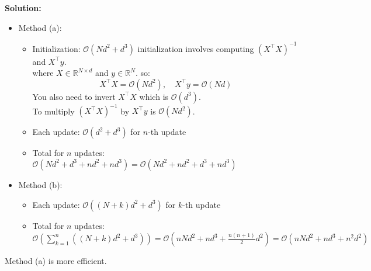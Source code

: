 \documentclass[a3paper,12pt]{extarticle} %
\begin{document}
\begin{enumerate}
\begin{enumerate}
            \textbf{Solution:}
            \begin{itemize}
                \item Method (a):
                \begin{itemize}
                    \item Initialization: \( \mathcal{O}(Nd^2 + d^3) \)
                    initialization involves computing \( (X^\top X)^{-1} \) and \( X^\top y \).
                    \\ where \( X \in \mathbb{R}^{N \times d} \) and \( y \in \mathbb{R}^N \). so:
                    \[
                    X^\top X = \mathcal{O}(Nd^2), \quad X^\top y = \mathcal{O}(Nd)
                    \]
                    You also need to invert \( X^\top X \) which is \( \mathcal{O}(d^3) \).
                    \\ To multiply \( (X^\top X)^{-1} \) by \( X^\top y \) is \( \mathcal{O}(Nd^2) \).  
                    \item Each update: \( \mathcal{O}(d^2 + d^3) \) for \( n \)-th update
                    \item Total for \( n \) updates: \( \mathcal{O}(Nd^2 + d^3 + nd^2 + nd^3) = \mathcal{O}(Nd^2 + nd^2 + d^3 + nd^3) \)
                \end{itemize}
                \item Method (b):
                \begin{itemize}
                    \item Each update: \( \mathcal{O}((N+k)d^2 + d^3) \) for \( k \)-th update
                    \item Total for \( n \) updates: \( \mathcal{O}(\sum_{k=1}^n ((N+k)d^2 + d^3)) = \mathcal{O}(nNd^2 + nd^3 + \frac{n(n+1)}{2}d^2) = \mathcal{O}(nNd^2 + nd^3 + n^2d^2) \)
                \end{itemize}
            \end{itemize}
            Method (a) is more efficient.
        \end{enumerate}
\end{enumerate}
\end{document}
